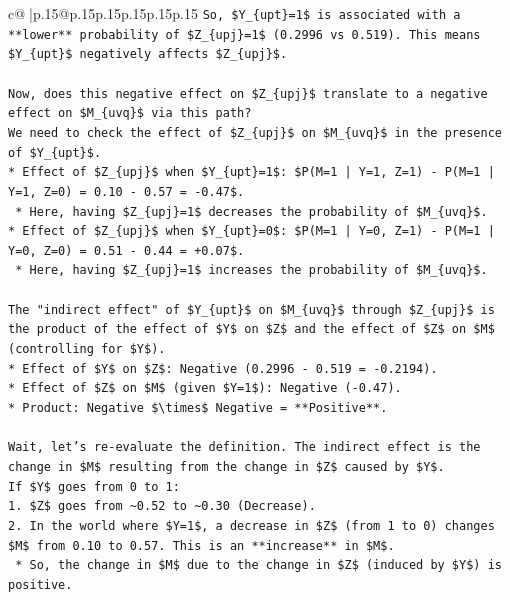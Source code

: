 \documentclass{article}
\begin{document}
{\begin{supertabular}{c@{$\;$}|p{.15\linewidth}@{}p{.15\linewidth}p{.15\linewidth}p{.15\linewidth}p{.15\linewidth}p{.15\linewidth}}
{{{\texttt{So, \$Y\_\{upt\}=1\$ is associated with a **lower** probability of \$Z\_\{upj\}=1\$ (0.2996 vs 0.519). This means \$Y\_\{upt\}\$ negatively affects \$Z\_\{upj\}\$.} \\
\\ 
\texttt{Now, does this negative effect on \$Z\_\{upj\}\$ translate to a negative effect on \$M\_\{uvq\}\$ via this path?} \\
\texttt{We need to check the effect of \$Z\_\{upj\}\$ on \$M\_\{uvq\}\$ in the presence of \$Y\_\{upt\}\$.} \\
\texttt{*   Effect of \$Z\_\{upj\}\$ when \$Y\_\{upt\}=1\$: \$P(M=1 | Y=1, Z=1) {-} P(M=1 | Y=1, Z=0) = 0.10 {-} 0.57 = {-}0.47\$.} \\
\texttt{    *   Here, having \$Z\_\{upj\}=1\$ decreases the probability of \$M\_\{uvq\}\$.} \\
\texttt{*   Effect of \$Z\_\{upj\}\$ when \$Y\_\{upt\}=0\$: \$P(M=1 | Y=0, Z=1) {-} P(M=1 | Y=0, Z=0) = 0.51 {-} 0.44 = +0.07\$.} \\
\texttt{    *   Here, having \$Z\_\{upj\}=1\$ increases the probability of \$M\_\{uvq\}\$.} \\
\\ 
\texttt{The "indirect effect" of \$Y\_\{upt\}\$ on \$M\_\{uvq\}\$ through \$Z\_\{upj\}\$ is the product of the effect of \$Y\$ on \$Z\$ and the effect of \$Z\$ on \$M\$ (controlling for \$Y\$).} \\
\texttt{*   Effect of \$Y\$ on \$Z\$: Negative (0.2996 {-} 0.519 = {-}0.2194).} \\
\texttt{*   Effect of \$Z\$ on \$M\$ (given \$Y=1\$): Negative ({-}0.47).} \\
\texttt{*   Product: Negative \$\textbackslash{}times\$ Negative = **Positive**.} \\
\\ 
\texttt{Wait, let's re{-}evaluate the definition. The indirect effect is the change in \$M\$ resulting from the change in \$Z\$ caused by \$Y\$.} \\
\texttt{If \$Y\$ goes from 0 to 1:} \\
\texttt{1.  \$Z\$ goes from \textasciitilde{}0.52 to \textasciitilde{}0.30 (Decrease).} \\
\texttt{2.  In the world where \$Y=1\$, a decrease in \$Z\$ (from 1 to 0) changes \$M\$ from 0.10 to 0.57. This is an **increase** in \$M\$.} \\
\texttt{    *   So, the change in \$M\$ due to the change in \$Z\$ (induced by \$Y\$) is positive.} \\
}}}
\end{supertabular}}
\end{document}
